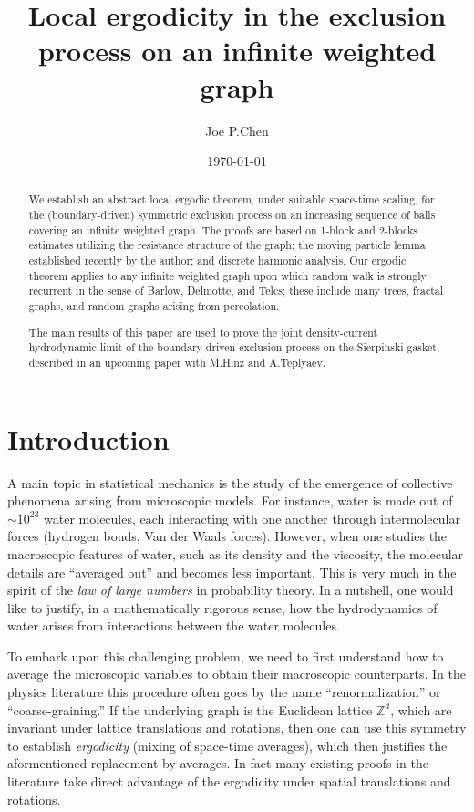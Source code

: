 \documentclass[11pt]{amsart}
\title[Local ergodicity in the exclusion process on an infinite weighted graph]{Local ergodicity in the exclusion process on an infinite weighted graph}
\author{Joe P.\@ Chen}
\date{\today}
\theoremstyle{plain}
\theoremstyle{definition}
\theoremstyle{remark}
\begin{document}

\maketitle

\begin{abstract}
We establish an abstract local ergodic theorem, under suitable space-time scaling, for the (boundary-driven) symmetric exclusion process on an increasing sequence of balls covering an infinite weighted graph. The proofs are based on 1-block and 2-blocks estimates utilizing the resistance structure of the graph; the moving particle lemma established recently by the author; and discrete harmonic analysis. Our ergodic theorem applies to any infinite weighted graph upon which random walk is strongly recurrent in the sense of Barlow, Delmotte, and Telcs; these include many trees, fractal graphs, and random graphs arising from percolation.

The main results of this paper are used to prove the joint density-current hydrodynamic limit of the boundary-driven exclusion process on the Sierpinski gasket, described in an upcoming paper with M.\@ Hinz and A.\@ Teplyaev.

\tableofcontents
\end{abstract}

\section{Introduction}

A main topic in statistical mechanics is the study of the emergence of collective phenomena arising from microscopic models. For instance, water is made out of $\sim 10^{23}$ water molecules, each interacting with one another through intermolecular forces (hydrogen bonds, Van der Waals forces). However, when one studies the macroscopic features of water, such as its density and the viscosity, the molecular details are ``averaged out'' and becomes less important. This is very much in the spirit of the \emph{law of large numbers} in probability theory. In a nutshell, one would like to justify, in a mathematically rigorous sense, how the hydrodynamics of water arises from interactions between the water molecules.

To embark upon this challenging problem, we need to first understand how to average the microscopic variables to obtain their macroscopic counterparts. In the physics literature this procedure often goes by the name ``renormalization'' or ``coarse-graining.'' If the underlying graph is the Euclidean lattice $\mathbb{Z}^d$, which are invariant under lattice translations and rotations, then one can use this symmetry to establish \emph{ergodicity} (mixing of space-time averages), which then justifies the aformentioned replacement by averages. In fact many existing proofs in the literature take direct advantage of the ergodicity under spatial translations and rotations.
\end{document}
